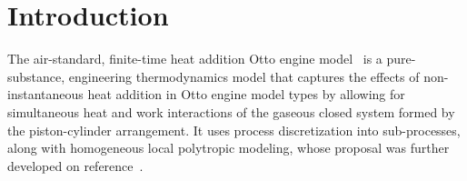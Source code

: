\section{Introduction}

    The air-standard, finite-time heat addition Otto engine model~\cite{2017-NaaktgeborenC-IntJMechEngEduc} is a pure-substance,
    engineering thermodynamics model that captures the effects of non-instantaneous heat addition in Otto engine model types  by
    allowing for simultaneous heat and work interactions of the gaseous closed system formed by the piston-cylinder arrangement.
    It uses process discretization into sub-processes, along with homogeneous local  polytropic  modeling,  whose  proposal  was
    further developed on reference~\cite{2020-NaaktgeborenC-Polytropic-engrXiv-rev02}.



